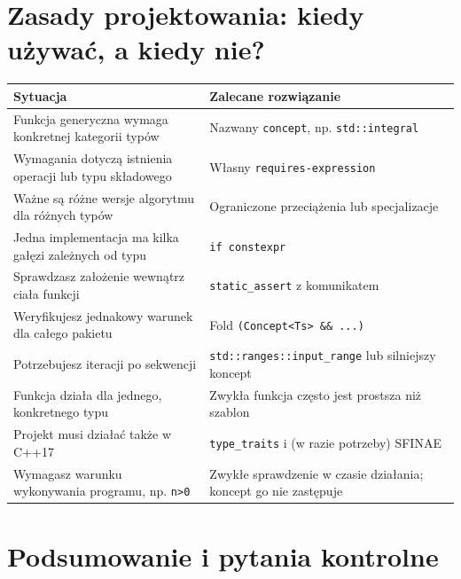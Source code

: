 \section{Zasady projektowania: kiedy używać, a kiedy nie?}

\begin{center}
\small
\begin{tabular}{|p{}|p{}|}
\hline
\textbf{Sytuacja} & \textbf{Zalecane rozwiązanie} \\
\hline
Funkcja generyczna wymaga konkretnej kategorii typów & Nazwany \texttt{concept}, np. \texttt{std::integral} \\
\hline
Wymagania dotyczą istnienia operacji lub typu składowego & Własny \texttt{requires-expression} \\
\hline
Ważne są różne wersje algorytmu dla różnych typów & Ograniczone przeciążenia lub specjalizacje \\
\hline
Jedna implementacja ma kilka gałęzi zależnych od typu & \texttt{if constexpr} \\
\hline
Sprawdzasz założenie wewnątrz ciała funkcji & \texttt{static\_assert} z komunikatem \\
\hline
Weryfikujesz jednakowy warunek dla całego pakietu & Fold \texttt{(Concept<Ts> \&\& ...)} \\
\hline
Potrzebujesz iteracji po sekwencji & \texttt{std::ranges::input\_range} lub silniejszy koncept \\
\hline
Funkcja działa dla jednego, konkretnego typu & Zwykła funkcja często jest prostsza niż szablon \\
\hline
Projekt musi działać także w C++17 & \texttt{type\_traits} i (w razie potrzeby) SFINAE \\
\hline
Wymagasz warunku wykonywania programu, np. \texttt{n>0} & Zwykłe sprawdzenie w czasie działania; koncept go nie zastępuje \\
\hline
\end{tabular}
\end{center}

\section{Podsumowanie i pytania kontrolne}

